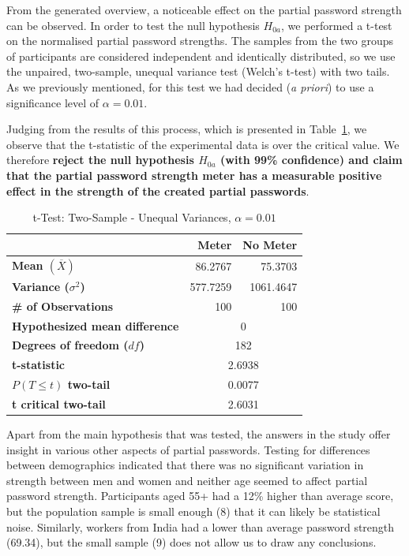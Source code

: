     From the generated overview, a noticeable effect on the partial password strength can be observed. In order to test the null hypothesis $H_{0a}$, we performed a t-test on the normalised partial password strengths. The samples from the two groups of participants are considered independent and identically distributed, so we use the unpaired, two-sample, unequal variance test (Welch's t-test) with two tails. As we previously mentioned, for this test we had decided (\emph{a priori}) to use a significance level of $\alpha = 0.01$.

    Judging from the results of this process, which is presented in Table~\ref{tab:t-test}, we observe that the t-statistic of the experimental data is over the critical value. We therefore \textbf{reject the null hypothesis $H_{0a}$ (with 99\% confidence) and claim that the partial password strength meter has a measurable positive effect in the strength of the created partial passwords}.

    \begin{table}[htpb]
      \centering
      \begin{tabular}{l r r}
      \toprule
      & \textbf{Meter} & \textbf{No Meter} \\
      \midrule
      \textbf{Mean $(\overline{X})$} & 86.2767 & 75.3703 \\
      \textbf{Variance ($\sigma^2$)} & 577.7259 & 1061.4647 \\
      \textbf{\# of Observations} & 100 & 100 \\
      \midrule
      \textbf{Hypothesized mean difference} & \multicolumn{2}{c}{0} \\
      \textbf{Degrees of freedom ($df$)} & \multicolumn{2}{c}{182} \\
      \textbf{t-statistic} & \multicolumn{2}{c}{2.6938} \\
      \textbf{$P(T\leq t)$ two-tail} & \multicolumn{2}{c}{0.0077} \\
      \textbf{t critical two-tail} & \multicolumn{2}{c}{2.6031} \\
      \bottomrule
      \end{tabular}
      \caption{t-Test: Two-Sample - Unequal Variances, $\alpha = 0.01$}
      \label{tab:t-test}
    \end{table}

    Apart from the main hypothesis that was tested, the answers in the study offer insight in various other aspects of partial passwords. Testing for differences between demographics indicated that there was no significant variation in strength between men and women and neither age seemed to affect partial password strength. Participants aged 55+ had a 12\% higher than average score, but the population sample is small enough (8) that it can likely be statistical noise. Similarly, workers from India had a lower than average password strength (69.34), but the small sample (9) does not allow us to draw any conclusions.

